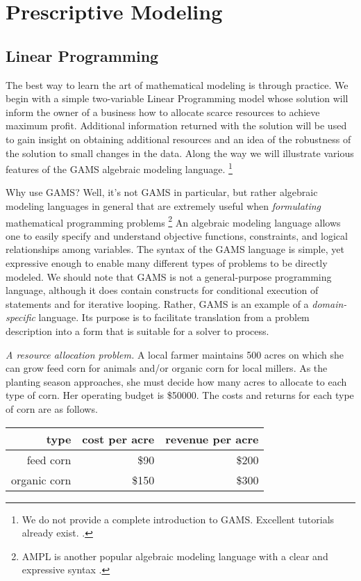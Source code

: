 \chapter{Prescriptive Modeling}

\section{Linear Programming}

The best way to learn the art of mathematical modeling is through practice.
We begin with a simple two-variable Linear Programming model whose solution
will inform the owner of a business how to allocate scarce resources to achieve
maximum profit. Additional information returned with the solution will be used
to gain insight on obtaining additional resources and an idea of the robustness
of the solution to small changes in the data.
Along the way we will
illustrate various features of the GAMS algebraic modeling language. 
\footnote{We do not provide a complete introduction to GAMS.
Excellent tutorials already exist. \cite{Rosenthal,GAMS}.}

Why use GAMS? Well, it's not GAMS in particular, but rather
algebraic modeling languages in general that are extremely useful
when \emph{formulating} mathematical programming problems
\footnote{AMPL is another popular algebraic modeling language with a 
clear and expressive syntax \cite{fourer:2003}.} An
algebraic modeling language allows one to easily specify and
understand objective functions, constraints, and logical relationships
among variables. The syntax of the GAMS language is simple,
yet expressive enough to enable many different types of problems to be
directly modeled. We should note that GAMS is not a general-purpose
programming language, although it does contain constructs for
conditional execution of statements and for iterative looping.
Rather, GAMS is an example of a \emph{domain-specific} language.  Its
purpose is to facilitate translation from a problem description into a
form that is suitable for a solver to process.

\emph{A resource allocation problem.}
A local farmer maintains 500 acres on which she can grow feed corn for animals
and/or organic corn for local millers. As the planting season approaches,
she must decide how many acres to allocate to each type of corn.
Her operating budget is \$\num{50000}. The costs and returns for each
type of corn are as follows.

\vspace{.1in}
\begin{tabular}{rrr}
type & cost per acre & revenue per acre \\ \hline
feed corn & \$90 & \$200 \\
organic corn & \$150 & \$300
\end{tabular}
\vspace{.1in}


